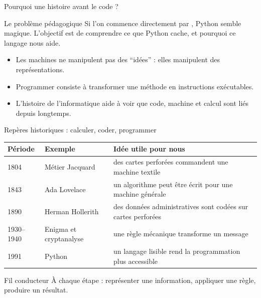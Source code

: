 \documentclass[10pt,aspectratio=169]{beamer}
\begin{document}
\begin{frame}{Pourquoi une histoire avant le code ?}
\begin{block}{Le problème pédagogique}
Si l’on commence directement par , Python semble magique. L’objectif est de comprendre ce que Python cache, et pourquoi ce langage nous aide.
\end{block}
\begin{itemize}
  \item Les machines ne manipulent pas des “idées” : elles manipulent des représentations.
  \item Programmer consiste à transformer une méthode en instructions exécutables.
  \item L’histoire de l’informatique aide à voir que code, machine et calcul sont liés depuis longtemps.
\end{itemize}
\end{frame}

\begin{frame}{Repères historiques : calculer, coder, programmer}
\begin{tabular}{@{}p{}p{}p{}@{}}
\toprule
Période & Exemple & Idée utile pour nous \\
\midrule
1804 & Métier Jacquard & des cartes perforées commandent une machine textile \\
1843 & Ada Lovelace & un algorithme peut être écrit pour une machine générale \\
1890 & Herman Hollerith & des données administratives sont codées sur cartes perforées \\
1930--1940 & Enigma et cryptanalyse & une règle mécanique transforme un message \\
1991 & Python & un langage lisible rend la programmation plus accessible \\
\bottomrule
\end{tabular}
\vspace{0.35cm}
\begin{block}{Fil conducteur}
À chaque étape : représenter une information, appliquer une règle, produire un résultat.
\end{block}
\end{frame}
\end{document}
